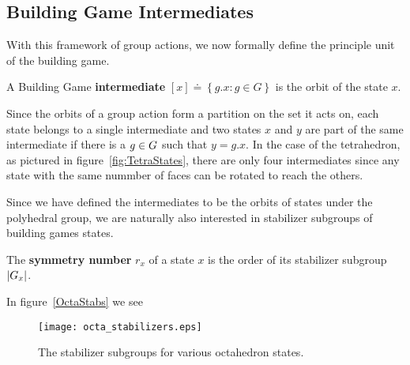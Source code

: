 \subsection{Building Game Intermediates}

With this framework of group actions, we now formally define the principle unit of the building game. 
\begin{mydef}
A Building Game \textbf{intermediate} $[x] \doteq \left\{g.x : g \in G\right\}$ is the orbit of the state $x$. 
\end{mydef}
Since the orbits of a group action form a partition on the set it acts on, each state belongs to a single intermediate and two states $x$ and $y$ are part of the same intermediate if there is a $g\in{G}$ such that $y = g.x$. In the case of the tetrahedron, as pictured in figure~\ref{fig:TetraStates}, there are only four intermediates since any state with the same nummber of faces can be rotated to reach the others. 


Since we have defined the intermediates to be the orbits of states under the polyhedral group, we are naturally also interested in stabilizer subgroups of building games states.
\begin{mydef}
The \textbf{symmetry number} $r_x$ of a state $x$ is the order of its stabilizer subgroup $\left|{G}_x\right|$.
\end{mydef}
In figure~\ref{OctaStabs} we see 
\begin{figure}[ht]
  \texttt{[image: octa\_stabilizers.eps]}
\caption{The stabilizer subgroups for various octahedron states.}
\label{fig:OctaStabs}
\end{figure}

